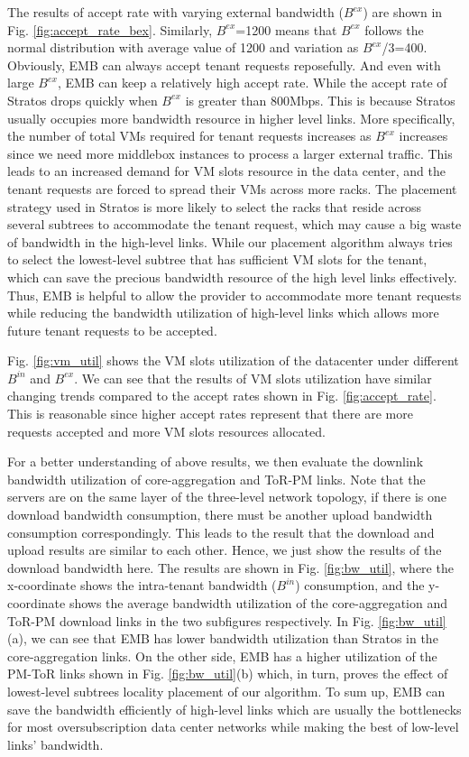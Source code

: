 \documentclass[review]{elsarticle}
\begin{document}
The results of accept rate with varying external bandwidth ($B^{ex}$) are shown in Fig. \ref{fig:accept_rate_bex}. Similarly, $B^{ex}$=1200 means that $B^{ex}$ follows the normal distribution with average value of 1200 and variation as $B^{ex}$/3=400. Obviously, EMB can always accept tenant requests reposefully. And even with large $B^{ex}$, EMB can keep a relatively high accept rate. While the accept rate of Stratos drops quickly when $B^{ex}$ is greater than 800Mbps. This is because Stratos usually occupies more bandwidth resource in higher level links. More specifically, the number of total VMs required for tenant requests increases as $B^{ex}$ increases since we need more middlebox instances to process a larger external traffic. This leads to an increased demand for VM slots resource in the data center, and the tenant requests are forced to spread their VMs across more racks. The placement strategy used in Stratos is more likely to select the racks that reside across several subtrees to accommodate the tenant request, which may cause a big waste of bandwidth in the high-level links. While our placement algorithm always tries to select the lowest-level subtree that has sufficient VM slots for the tenant, which can save the precious bandwidth resource of the high level links effectively. Thus, EMB is helpful to allow the provider to accommodate more tenant requests while reducing the bandwidth utilization of high-level links which allows more future tenant requests to be accepted.

Fig. \ref{fig:vm_util} shows the VM slots utilization of the datacenter under different $B^{in}$ and $B^{ex}$. We can see that the results of VM slots utilization have similar changing trends compared to the accept rates shown in Fig. \ref{fig:accept_rate}.
This is reasonable since higher accept rates represent that there are more requests accepted and more VM slots resources allocated.  

For a better understanding of above results, we then evaluate the downlink bandwidth utilization of core-aggregation and ToR-PM links. Note that the servers are on the same layer of the three-level network topology, if there is one download bandwidth consumption, there must be another upload bandwidth consumption correspondingly. This leads to the result that the download and upload results are similar to each other. Hence, we just show the results of the download bandwidth here. The results are shown in Fig. \ref{fig:bw_util}, where the x-coordinate shows the intra-tenant bandwidth ($B^{in}$) consumption, and the y-coordinate shows the average bandwidth utilization of the core-aggregation and ToR-PM download links in the two subfigures respectively. In Fig. \ref{fig:bw_util}(a), we can see that EMB has lower bandwidth utilization than Stratos in the core-aggregation links. On the other side, EMB has a higher utilization of the PM-ToR links shown in Fig. \ref{fig:bw_util}(b) which, in turn, proves the effect of lowest-level subtrees locality placement of our algorithm. To sum up, EMB can save the bandwidth efficiently of high-level links which are usually the bottlenecks for most oversubscription data center networks while making the best of low-level links’ bandwidth. 
\end{document}
